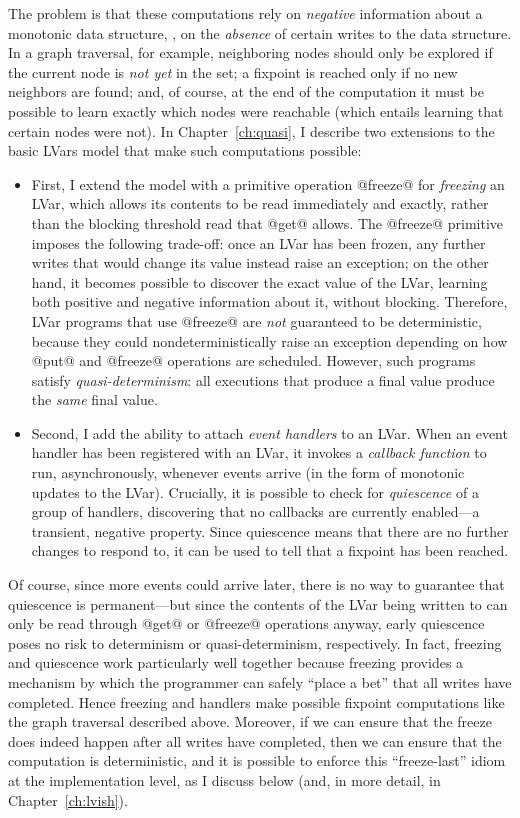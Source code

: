 The problem is that these computations rely on \emph{negative}
information about a monotonic data structure, \ie, on the
\emph{absence} of certain writes to the data structure.  In a graph
traversal, for example, neighboring nodes should only be explored if
the current node is \emph{not yet} in the set; a fixpoint is reached
only if no new neighbors are found; and, of course, at the end of the
computation it must be possible to learn exactly which nodes were
reachable (which entails learning that certain nodes were not).  In
Chapter~\ref{ch:quasi}, I describe two extensions to the basic LVars
model that make such computations possible:
\begin{itemize}
\item First, I extend the model with a primitive operation @freeze@
  for \emph{freezing} an LVar, which allows its contents to be read
  immediately and exactly, rather than the blocking threshold read
  that @get@ allows.  The @freeze@ primitive imposes the following
  trade-off: once an LVar has been frozen, any further writes that
  would change its value instead raise an exception; on the other
  hand, it becomes possible to discover the exact value of the LVar,
  learning both positive and negative information about it, without
  blocking.  Therefore, LVar programs that use @freeze@ are \emph{not}
  guaranteed to be deterministic, because they could
  nondeterministically raise an exception depending on how @put@ and
  @freeze@ operations are scheduled.  However, such programs satisfy
  \emph{quasi-determinism}: all executions that produce a final value
  produce the \emph{same} final value.
\item Second, I add the ability to attach \emph{event handlers} to an
  LVar.  When an event handler has been registered with an LVar, it
  invokes a \emph{callback function} to run, asynchronously, whenever
  events arrive (in the form of monotonic updates to the LVar).
  Crucially, it is possible to check for \emph{quiescence} of a group
  of handlers, discovering that no callbacks are currently enabled---a
  transient, negative property.  Since quiescence means that there are
  no further changes to respond to, it can be used to tell that a
  fixpoint has been reached.
\end{itemize}
Of course, since more events could arrive later, there is no way to
guarantee that quiescence is permanent---but since the contents of the
LVar being written to can only be read through @get@ or @freeze@
operations anyway, early quiescence poses no risk to determinism or
quasi-determinism, respectively.  In fact, freezing and quiescence
work particularly well together because freezing provides a mechanism
by which the programmer can safely ``place a bet'' that all writes
have completed.  Hence freezing and handlers make possible fixpoint
computations like the graph traversal described above.  Moreover, if
we can ensure that the freeze does indeed happen after all writes have
completed, then we can ensure that the computation is deterministic,
and it is possible to enforce this ``freeze-last'' idiom at the
implementation level, as I discuss below (and, in more detail, in
Chapter~\ref{ch:lvish}).

